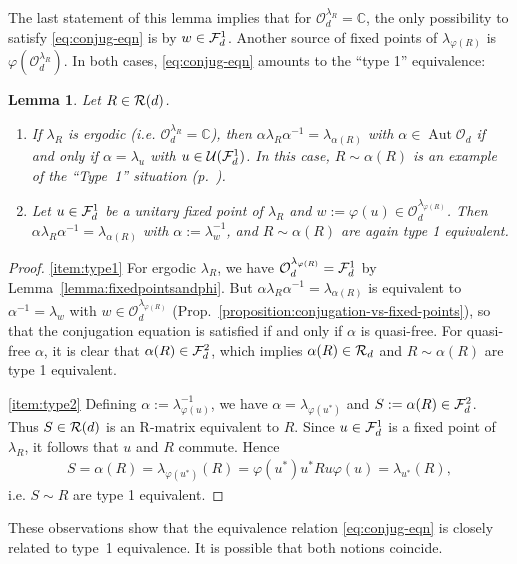 \documentclass[12pt,a4paper]{amsart}
\numberwithin{equation}{section}
\newtheorem{lemma}[theorem]{Lemma}
\theoremstyle{remark}
\def\Aut{\operatorname{Aut}}
\newcommand{\Cl}{\mathbb{C}}
\newcommand{\la}{\lambda}
\newcommand{\CO}[0]{\mathcal{O}} \newcommand{\CP}[0]{\mathcal{P}}
\newcommand{\CU}[0]{\mathcal{U}} \newcommand{\CV}[0]{\mathcal{V}}
\begin{document}
The last statement of this lemma implies that for $\CO_d^{\la_R}=\Cl$, the only possibility to satisfy \eqref{eq:conjug-eqn} is by $w\in\mathcal{F}_d^1$. Another source of fixed points of $\la_{\varphi(R)}$ is $\varphi(\CO_d^{\la_R})$. In both cases, \eqref{eq:conjug-eqn} amounts to the ``type 1'' equivalence: 

\begin{lemma}
    Let $R\in\mathcal{R}(d)$.
    \begin{enumerate}
     \item\label{item:type1} If $\lambda_R$ is ergodic (i.e. $\CO_d^{\la_R}=\Cl$), then $\alpha\lambda_R\alpha^{-1}=\lambda_{\alpha(R)}$ with  $\alpha\in\Aut\CO_d$ if and only if $\alpha=\la_u$ with $u\in\CU(\CF_d^1)$. In this case, $R\sim\alpha(R)$ is an example of the ``Type~1'' situation (p.~\pageref{page:types}).
     \item\label{item:type2} Let $u\in\mathcal{F}_d^1$ be a unitary fixed point of $\la_R$ and $w:=\varphi(u)\in\CO_d^{\la_{\varphi(R)}}$. Then $\alpha\lambda_R\alpha^{-1}=\lambda_{\alpha(R)}$ with $\alpha:=\la_w^{-1}$, and $R\sim\alpha(R)$ are again type 1 equivalent.
    \end{enumerate}
\end{lemma}
\begin{proof}
    \ref{item:type1} For ergodic $\lambda_R$, we have $\CO_d^{\lambda_{\varphi(R)}}=\CF_d^1$ by Lemma~\ref{lemma:fixedpointsandphi}. But $\alpha\lambda_R\alpha^{-1}=\lambda_{\alpha(R)}$ is equivalent to $\alpha^{-1}=\lambda_w$ with $w\in\CO_d^{\lambda_{\varphi(R)}}$ (Prop.~\ref{proposition:conjugation-vs-fixed-points}), so that the conjugation equation is satisfied if and only if $\alpha$ is quasi-free. For quasi-free $\alpha$, it is clear that $\alpha(R)\in\mathcal{F}_d^2$, which implies $\alpha(R)\in\mathcal{R}_d$ and $R\sim\alpha(R)$ are type 1 equivalent.
    
    \ref{item:type2} Defining $\alpha:=\la_{\varphi(u)}^{-1}$, we have $\alpha=\la_{\varphi(u^*)}$ and $S:=\alpha(R)\in\mathcal{F}_d^2$. Thus $S\in\mathcal{R}(d)$ is an R-matrix equivalent to $R$. Since $u\in\mathcal{F}_d^1$ is a fixed point of $\la_R$, it follows that $u$ and $R$ commute. Hence 
    \begin{align}
     S=\alpha(R)
     =
     \la_{\varphi(u^*)}(R)
     =
     \varphi(u^*)u^*Ru\varphi(u)
     =
     \la_{u^*}(R),
    \end{align}
    i.e. $S\sim R$ are type 1 equivalent.
\end{proof}

These observations show that the equivalence relation \eqref{eq:conjug-eqn} is closely related to type~1 equivalence. It is possible that both notions coincide.
\end{document}
